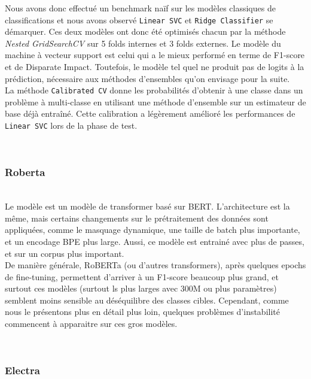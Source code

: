 Nous avons donc effectué un benchmark naïf sur les modèles classiques de classifications et nous avons observé \texttt{Linear SVC} et \texttt{Ridge Classifier} se démarquer. Ces deux modèles ont donc été optimisés chacun par la méthode \textit{Nested GridSearchCV} sur \textsf{5} folds internes et \textsf{3} folds externes. Le modèle du machine à vecteur support est celui qui a le mieux performé en terme de F1-score et de Disparate Impact. Toutefois, le modèle tel quel ne produit pas de logits à la prédiction, nécessaire aux méthodes d'ensembles qu'on envisage pour la suite.\\
La méthode \texttt{Calibrated CV} donne les probabilités d'obtenir à une classe dans un problème à multi-classe en utilisant une méthode d'ensemble sur un estimateur de base déjà entraîné. Cette calibration a légèrement amélioré les performances de \texttt{Linear SVC} lors de la phase de test.

\hfill\\
\subsubsection{Roberta}
\hfill\\

Le modèle  est un modèle de transformer basé sur BERT. L'architecture est la même, mais certains changements sur le prétraitement des données sont appliquées, comme le masquage dynamique, une taille de batch plus importante, et un encodage BPE plus large. Aussi, ce modèle est entrainé avec plus de passes, et sur un corpus plus important. \\
De manière générale, RoBERTa (ou d'autres transformers), après quelques epochs de fine-tuning, permettent d'arriver à un F1-score beaucoup plus grand, et surtout ces modèles (surtout ls plus larges avec 300M ou plus paramètres) semblent moins sensible au déséquilibre des classes cibles. Cependant, comme nous le présentons plus en détail plus loin, quelques problèmes d'instabilité commencent à apparaitre sur ces gros modèles.

\hfill\\
\subsubsection{Electra}
\hfill\\

\hfill\\
